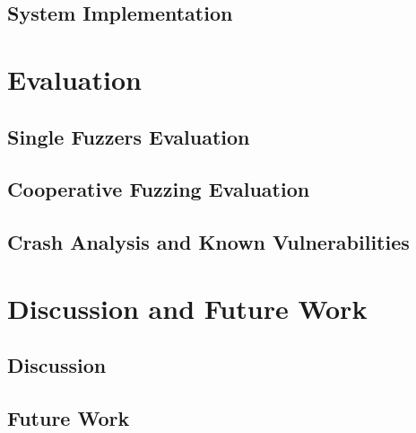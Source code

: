 \documentclass[handout]{beamer}
\begin{document}
\subsection{System Implementation}

\section{Evaluation}

\subsection{Single Fuzzers Evaluation}

\subsection{Cooperative Fuzzing Evaluation}

\subsection{Crash Analysis and Known Vulnerabilities}

\section{Discussion and Future Work}

\subsection*{Discussion}

\subsection*{Future Work}
\end{document}
